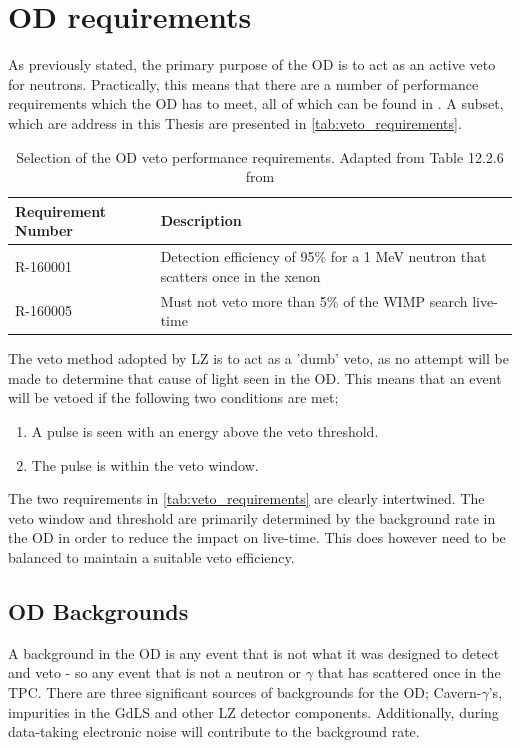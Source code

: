 \section{OD requirements}
\label{sec:simulated_od_requirements}
\par
As previously stated, the primary purpose of the OD is to act as an active veto for neutrons.
Practically, this means that there are a number of performance requirements which the OD has to meet, all of which can be found in \cite{LZ_TechnicalDesignReview_ref}.
A subset, which are address in this Thesis are presented in \autoref{tab:veto_requirements}.

\begin{table}[!htbp]
    \centering
    \begin{tabular}{p{}p{}} %
    \hline
    {Requirement Number} & {Description} \\ \hline
    R-160001             & Detection efficiency of 95\% for a 1 MeV neutron that scatters once in the xenon \\
    R-160005             & Must not veto more than 5\% of the WIMP search live-time
    \end{tabular}
    \caption{Selection of the OD veto performance requirements. Adapted from Table 12.2.6 from \cite{LZ_TechnicalDesignReview_ref}}
    \label{tab:veto_requirements}
\end{table} 

\par
The veto method adopted by LZ is to act as a 'dumb' veto, as no attempt will be made to determine that cause of light seen in the OD.
This means that an event will be vetoed if the following two conditions are met;
\begin{enumerate}
    \item A pulse is seen with an energy above the veto threshold.
    \item The pulse is within the veto window.
\end{enumerate}
The two requirements in \autoref{tab:veto_requirements} are clearly intertwined.
The veto window and threshold are primarily determined by the background rate in the OD in order to reduce the impact on live-time.
This does however need to be balanced to maintain a suitable veto efficiency.

\subsection{OD Backgrounds}
\label{sec:simulated_od_backgrounds}
\par
A background in the OD is any event that is not what it was designed to detect and veto - so any event that is not a neutron or $\gamma$ that has scattered once in the TPC.
There are three significant sources of backgrounds for the OD; Cavern-$\gamma$'s, impurities in the GdLS and other LZ detector components.
Additionally, during data-taking electronic noise will contribute to the background rate. 

